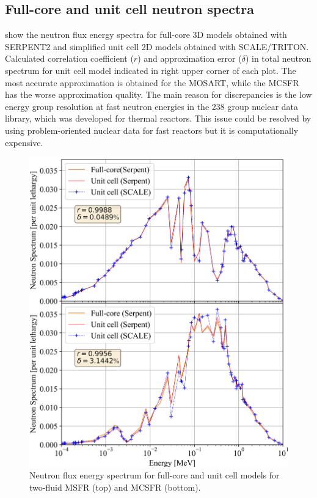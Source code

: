 \documentclass{anstrans}
\begin{document}
\subsection{Full-core and unit cell neutron spectra} 
\label{sec:spectrum}
 show the neutron flux energy spectra for full-core 3D models obtained with SERPENT2 and simplified unit cell 2D models obtained with SCALE/TRITON. Calculated correlation coefficient ($r$) and approximation error ($\delta$) in total neutron spectrum for unit cell model indicated in right upper corner of each plot. The most accurate approximation is obtained for the \gls{MOSART}, while the \gls{MCSFR} has the worse approximation quality. The main reason for discrepancies is the low energy group resolution at fast neutron energies in the 238 group nuclear data library, which was developed for thermal reactors. This issue could be resolved by using problem-oriented nuclear data for fast reactors but it is computationally expensive. 
\begin{figure}[!htb]
  \centering
  \includegraphics[scale=0.545]{./Figures/two_full_vs_unit_spectrum.png}
      \vspace{-0.2in}
  \caption{Neutron flux energy spectrum for full-core and unit cell models for two-fluid \gls{MSFR} (top) and \gls{MCSFR} (bottom).}   
    \vspace{-0.1in}
  \label{fig:spectrum_two}
\end{figure}
\end{document}
